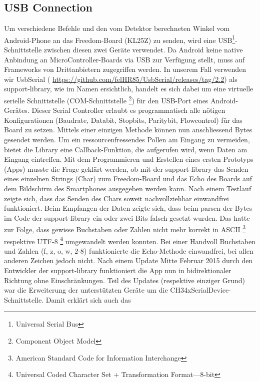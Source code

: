 \subsection{USB Connection}
Um verschiedene Befehle und den vom Detektor berechneten Winkel vom Android-Phone an das Freedom-Board (KL25Z) 
zu senden, wird eine USB\footnote{Universal Serial Bus}-Schnittstelle zwischen diesen zwei Geräte verwendet.
\newline
Da Android keine native Anbindung an MicroController-Boards via USB zur Verfügung stellt, muss auf 
Frameworks von Drittanbietern zugegriffen werden. In unserem Fall verwenden wir UsbSerial (
\url{https://github.com/felHR85/UsbSerial/releases/tag/2.2}) als support-library, wie im Namen ersichtlich, 
handelt es sich dabei um eine virtuelle serielle Schnittstelle (COM-Schnittstelle \footnote{Component Object Model})
für den USB-Port eines Android-Gerätes. Dieser Serial Controller erlaubt es programmatisch alle nötigen Konfigurationen 
(Baudrate, Databit, Stopbits, Paritybit, Flowcontrol) für das Board zu setzen. Mittels einer einzigen 
Methode können nun anschliessend Bytes gesendet werden. Um ein ressourcenfressendes Pollen am Eingang zu vermeiden, 
bietet die Library eine Callback-Funktion, die aufgerufen wird, wenn Daten am Eingang eintreffen.
\newline
Mit dem Programmieren und Erstellen eines ersten Prototyps (Apps) musste die Frage geklärt werden, 
ob mit der support-library das Senden eines einzelnen Strings (Char) zum Freedom-Board und das Echo des 
Boards auf dem Bildschirm des Smartphones ausgegeben werden kann. Nach einem Testlauf zeigte sich, dass
das Senden des Chars soweit nachvollziehbar einwandfrei funktioniert. Beim Empfangen der Daten zeigte 
sich, dass beim parsen der Bytes im Code der support-library ein oder zwei Bits falsch gesetzt wurden. 
Das hatte zur Folge, dass gewisse Buchstaben oder Zahlen nicht mehr korrekt in ASCII 
\footnote{American Standard Code for Information Interchange} respektive UTF-8 
\footnote{Universal Coded Character Set + Transformation Format—8-bit}
umgewandelt werden konnten. Bei einer Handvoll Buchstaben und Zahlen (f, z, o, w, 2-8) funktionierte die
Echo-Methode einwandfrei, bei allen anderen Zeichen jedoch nicht.
\newline
\newline
Nach einem Update Mitte Februar 2015 durch den Entwickler der support-library funktioniert die App nun 
in bidirektionaler Richtung ohne Einschränkungen. Teil des Updates (respektive einziger Grund) war die 
Erweiterung der unterstützten Geräte um die CH34xSerialDevice-Schnittstelle. Damit erklärt sich auch das 
